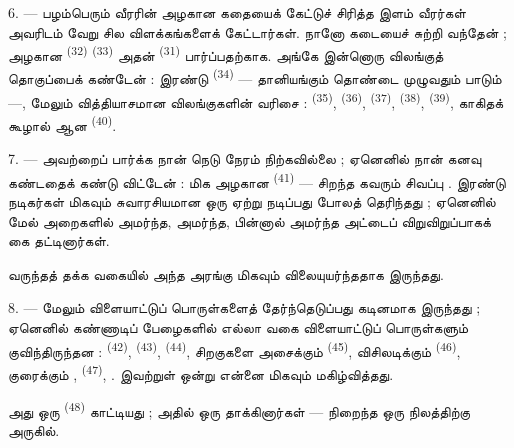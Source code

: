 6. --- பழம்பெரும் வீரரின் அழகான கதையைக் கேட்டுச் சிரித்த இளம்
வீரர்கள் அவரிடம் வேறு சில விளக்கங்களைக் கேட்டார்கள். நானோ
கடையைச் சுற்றி வந்தேன் ; அழகான 
\textsuperscript{(32)}  \textsuperscript{(33)} அதன்
 \textsuperscript{(31)} பார்ப்பதற்காக. அங்கே
இன்னொரு விலங்குத் தொகுப்பைக் கண்டேன் : இரண்டு  \textsuperscript{(34)} — தானியங்கும் 
தொண்டை முழுவதும் பாடும்  —, மேலும்
வித்தியாசமான விலங்குகளின் வரிசை : 
\textsuperscript{(35)},  \textsuperscript{(36)},
 \textsuperscript{(37)}, 
\textsuperscript{(38)},  \textsuperscript{(39)},
காகிதக் கூழால் ஆன  \textsuperscript{(40)}.

7. --- அவற்றைப் பார்க்க நான் நெடு நேரம் நிற்கவில்லை ; ஏனெனில் நான்
கனவு கண்டதைக் கண்டு விட்டேன் : மிக அழகான  \textsuperscript{(41)} — சிறந்த  கவரும் சிவப்பு .
 இரண்டு நடிகர்கள் மிகவும் சுவாரசியமான ஒரு
  ஏற்று நடிப்பது போலத்
தெரிந்தது ; ஏனெனில் மேல் அறைகளில் அமர்ந்த,  அமர்ந்த, 
பின்னால்  அமர்ந்த அட்டைப்
 விறுவிறுப்பாகக் கை தட்டினார்கள்.

வருந்தத் தக்க வகையில் அந்த அரங்கு மிகவும் விலையுயர்ந்ததாக இருந்தது.

8. --- மேலும் விளையாட்டுப் பொருள்களைத் தேர்ந்தெடுப்பது கடினமாக
இருந்தது ; ஏனெனில் கண்ணாடிப் பேழைகளில் எல்லா வகை விளையாட்டுப்
பொருள்களும் குவிந்திருந்தன : 
\textsuperscript{(42)},  \textsuperscript{(43)},
 \textsuperscript{(44)}, சிறகுகளை அசைக்கும்
 \textsuperscript{(45)}, விசிலடிக்கும்
 \textsuperscript{(46)}, குரைக்கும்
, 
\textsuperscript{(47)}, .
இவற்றுள் ஒன்று என்னை மிகவும் மகிழ்வித்தது.


அது ஒரு  \textsuperscript{(48)} காட்டியது ; அதில்
ஒரு   தாக்கினார்கள் —
 நிறைந்த ஒரு நிலத்திற்கு அருகில்.

